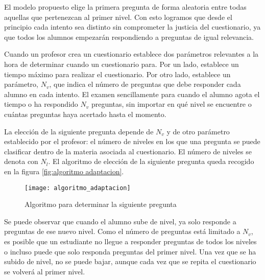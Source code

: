 El modelo propuesto elige la primera pregunta de forma aleatoria entre todas aquellas que pertenezcan al primer nivel. Con esto logramos que desde el principio cada intento sea distinto sin comprometer la justicia del cuestionario, ya que todos los alumnos empezarán respondiendo a preguntas de igual relevancia.

Cuando un profesor crea un cuestionario establece dos parámetros relevantes a la hora de determinar cuando un cuestionario para. Por un lado, establece un tiempo máximo para realizar el cuestionario. Por otro lado, establece un parámetro, $N_v$, que indica el número de preguntas que debe responder cada alumno en cada intento. El examen sencillamente para cuando el alumno agota el tiempo o ha respondido $N_v$ preguntas, sin importar en qué nivel se encuentre o cuántas preguntas haya acertado hasta el momento.

La elección de la siguiente pregunta depende de $N_v$ y de otro parámetro establecido por el profesor: el número de niveles en los que una pregunta se puede clasificar dentro de la materia asociada al cuestionario. El número de niveles se denota con $N_l$. El algoritmo de elección de la siguiente pregunta queda recogido en la figura \ref{fig:algoritmo adaptacion}.

\begin{figure}[htp!]
	\centering
	\texttt{[image: algoritmo\_adaptacion]}
	\caption{Algoritmo para determinar la siguiente pregunta}
	\label{fig:algoritmo de adaptacion}
\end{figure}

Se puede observar que cuando el alumno sube de nivel, ya solo responde a preguntas de ese nuevo nivel. Como el número de preguntas está limitado a $N_v$, es posible que un estudiante no llegue a responder preguntas de todos los niveles o incluso puede que solo responda preguntas del primer nivel. Una vez que se ha subido de nivel, no se puede bajar, aunque cada vez que se repita el cuestionario se volverá al primer nivel.



